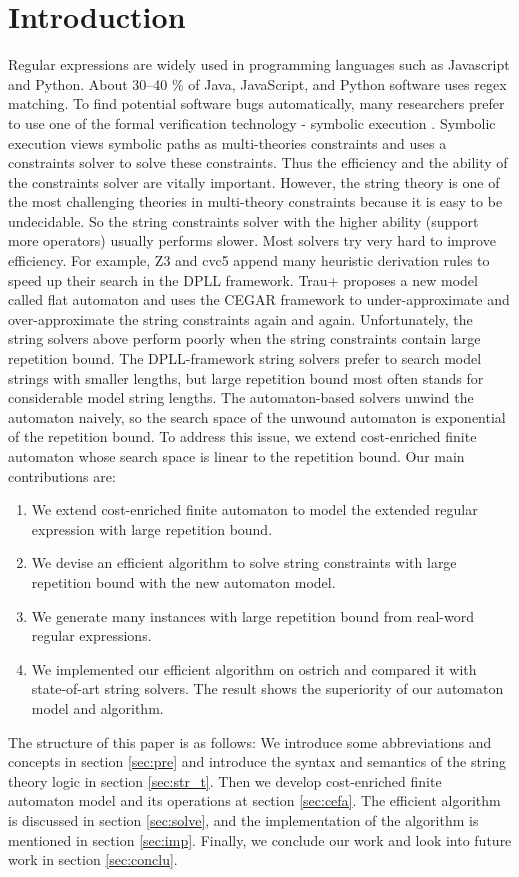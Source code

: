 \documentclass[sigconf]{acmart}
\begin{document}
\section{Introduction}
Regular expressions are widely used in programming languages such as Javascript and Python. About 30–40 \% of Java, JavaScript, and Python software uses regex
matching\cite{redos_fse2019}. To find
potential software bugs automatically, many researchers prefer to use one of the
formal verification technology - symbolic execution \cite{symbolic_pldi2021}. Symbolic execution views symbolic paths as multi-theories
constraints and uses a constraints solver to solve these constraints. Thus the
efficiency and the ability of the constraints solver are vitally important.
However, the string theory is one of the most challenging theories in multi-theory constraints because it is easy to be undecidable\cite{undecidable_2016}. So the string constraints solver with the higher
ability (support more operators) usually performs slower. Most solvers try very hard to improve efficiency. For example, Z3 and cvc5 append many heuristic
derivation rules to speed up their search in the DPLL framework. Trau+ proposes
a new model called flat automaton and uses the CEGAR framework to under-approximate
and over-approximate the string constraints again and again.
Unfortunately, the string solvers above perform poorly when the string constraints contain large repetition bound. The DPLL-framework string solvers prefer to
search model strings with smaller lengths, but large repetition bound most often stands
for considerable model string lengths. The automaton-based solvers
unwind the automaton naively, so the search space of the unwound automaton is
exponential of the repetition bound. To address this issue, we extend
cost-enriched finite automaton\cite{atva2020} whose search space is linear to the
repetition bound. Our main contributions are:
\begin{enumerate}
  \item We extend cost-enriched finite automaton to model the extended regular expression with large repetition bound.
  \item We devise an efficient algorithm to solve string constraints with large repetition bound with the new automaton model.
  \item We generate many instances with large repetition bound from real-word regular expressions.
  \item We implemented our efficient algorithm on ostrich and compared it with state-of-art string solvers. The result shows the superiority of our automaton model and algorithm.
\end{enumerate}
The structure of this paper is as follows: We introduce some abbreviations and concepts in section \ref{sec:pre} and introduce the syntax and semantics of the string theory logic in section \ref{sec:str_t}. Then we develop cost-enriched finite automaton model and its operations at section \ref{sec:cefa}. The efficient algorithm is discussed in section \ref{sec:solve}, and the implementation of the algorithm is mentioned in section \ref{sec:imp}. Finally, we conclude our work and look into future work in section \ref{sec:conclu}.
\end{document}
